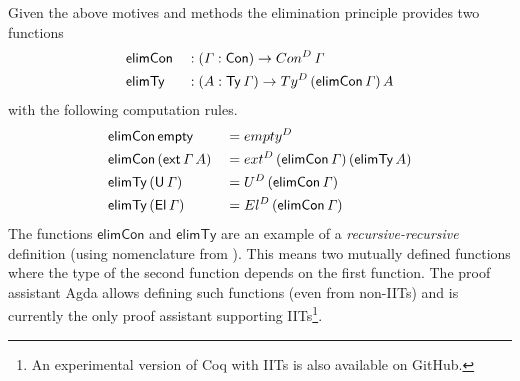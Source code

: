 \documentclass[a4paper,UKenglish,cleveref, autoref]{lipics-v2019}
\begin{document}
Given the above motives and methods the elimination principle provides
two functions
\begin{alignat*}{5}
  & \mathsf{elimCon} && : (\mathit{\Gamma}:\mathsf{Con})\rightarrow Con^D\,\mathit{\Gamma} \\
  & \mathsf{elimTy} && : (A:\mathsf{Ty}\,\mathit{\Gamma})\rightarrow Ty^D\,(\mathsf{elimCon}\,\mathit{\Gamma})\,A
\end{alignat*}
with the following computation rules.
\begin{alignat*}{5}
  & \mathsf{elimCon}\,\mathsf{empty} && = {empty}^D \\
  & \mathsf{elimCon}\,(\mathsf{ext}\,\mathit{\Gamma}\,A) && = {ext}^D\,(\mathsf{elimCon}\,\mathit{\Gamma})\,(\mathsf{elimTy}\,A) \\
  & \mathsf{elimTy}\,(\mathsf{U}\,\mathit{\Gamma}) && = U^D\,(\mathsf{elimCon}\,\mathit{\Gamma}) \\
  & \mathsf{elimTy}\,(\mathsf{El}\,\mathit{\Gamma}) && = El^D\,(\mathsf{elimCon}\,\mathit{\Gamma})
\end{alignat*}
The functions $\mathsf{elimCon}$ and $\mathsf{elimTy}$ are an example
of a \emph{recursive-recursive} definition (using nomenclature from
\cite{forsberg-phd}). This means two mutually defined functions where
the type of the second function depends on the first function. The
proof assistant Agda \cite{norell07thesis} allows defining such
functions (even from non-IITs) and is currently the only proof
assistant supporting IITs\footnote{An experimental version of Coq with
  IITs is also available on GitHub.}.
\end{document}
